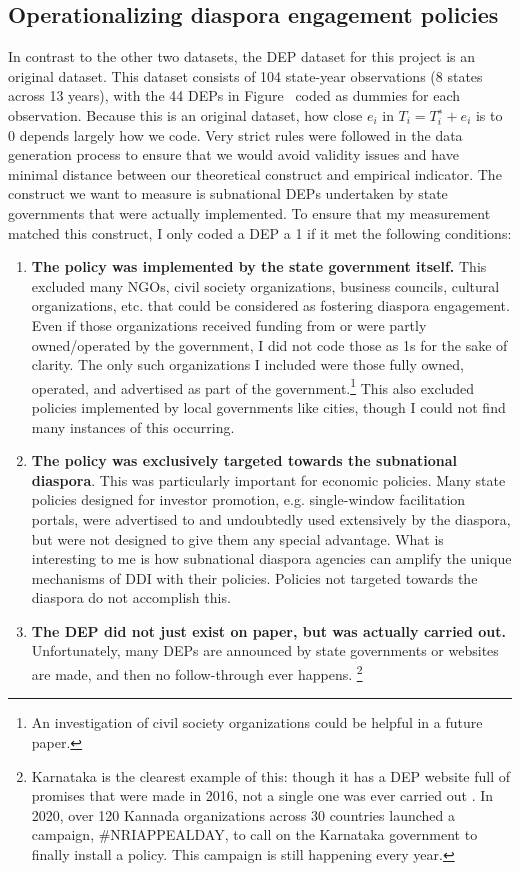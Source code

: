 \documentclass[12pt]{article}
\let\oldsubsection\subsection
\renewcommand{\subsection}{\FloatBarrier\oldsubsection}
\begin{document}
       \subsection{Operationalizing diaspora engagement policies} \label{ss:operationalizing DEPs}
			In contrast to the other two datasets, the DEP dataset for this project is an original dataset. This dataset consists of 104 state-year observations (8 states across 13 years), with the 44 DEPs in Figure~ coded as dummies for each observation.
            Because this is an original dataset, how close $e_i$ in $T_i=T_i^∗+e_i$ is to 0 depends largely how we code. Very strict rules were followed in the data generation process to ensure that we would avoid validity issues and have minimal distance between our theoretical construct and empirical indicator. The construct we want to measure is subnational DEPs undertaken by state governments that were actually implemented. To ensure that my measurement matched this construct, I only coded a DEP a 1 if it met the following conditions:
 \begin{enumerate}
     \item \textbf{The policy was implemented by the state government itself. }This excluded many NGOs, civil society organizations, business councils, cultural organizations, etc. that could be considered as fostering diaspora engagement. Even if those organizations received funding from or were partly owned/operated by the government, I did not code those as 1s for the sake of clarity. The only such organizations I included were those fully owned, operated, and advertised as part of the government.\footnote{An investigation of civil society organizations could be helpful in a future paper.} This also excluded policies implemented by local governments like cities, though I could not find many instances of this occurring.
     \item  \textbf{The policy was exclusively targeted towards the subnational diaspora}. This was particularly important for economic policies. Many state policies designed for investor promotion, e.g. single-window facilitation portals, were advertised to and undoubtedly used extensively by the diaspora, but were not designed to give them any special advantage. What is interesting to me is how subnational diaspora agencies can amplify the unique mechanisms of DDI with their policies. Policies not targeted towards the diaspora do not accomplish this.
     \item   \textbf{The DEP did not just exist on paper, but was actually carried out.} Unfortunately, many DEPs are announced by state governments or websites are made, and then no follow-through ever happens. \footnote{Karnataka is the clearest example of this: though it has a DEP website full of promises that were made in 2016, not a single one was ever carried out \citep{noauthor__nodate}. In 2020, over 120 Kannada organizations across 30 countries launched a campaign, \#NRIAPPEALDAY, to call on the Karnataka government to finally install a policy. \citet{noauthor_international_nodate} This campaign is still happening every year.}
 \end{enumerate}
\end{document}
